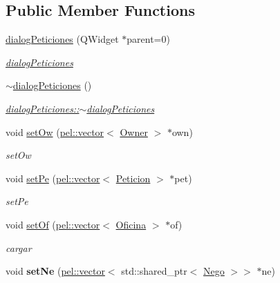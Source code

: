 \subsection*{Public Member Functions}
\begin{DoxyCompactItemize}
\item 
\hyperlink{classdialogPeticiones_a98d94817a71b0f17a67e4d50e26b0703}{dialog\+Peticiones} (Q\+Widget $\ast$parent=0)
\begin{DoxyCompactList}\small\item\em \hyperlink{classdialogPeticiones}{dialog\+Peticiones} \end{DoxyCompactList}\item 
\hypertarget{classdialogPeticiones_a7958c9d3b4c518f158b0290107b4a43f}{}\hyperlink{classdialogPeticiones_a7958c9d3b4c518f158b0290107b4a43f}{$\sim$dialog\+Peticiones} ()\label{classdialogPeticiones_a7958c9d3b4c518f158b0290107b4a43f}

\begin{DoxyCompactList}\small\item\em \hyperlink{classdialogPeticiones_a7958c9d3b4c518f158b0290107b4a43f}{dialog\+Peticiones\+::$\sim$dialog\+Peticiones} \end{DoxyCompactList}\item 
void \hyperlink{classdialogPeticiones_ac93f653300c0748b41af19e3dc47f167}{set\+Ow} (\hyperlink{classpel_1_1vector}{pel\+::vector}$<$ \hyperlink{classOwner}{Owner} $>$ $\ast$own)
\begin{DoxyCompactList}\small\item\em set\+Ow \end{DoxyCompactList}\item 
void \hyperlink{classdialogPeticiones_a6b202005bae543e302f64f0c5972714a}{set\+Pe} (\hyperlink{classpel_1_1vector}{pel\+::vector}$<$ \hyperlink{classPeticion}{Peticion} $>$ $\ast$pet)
\begin{DoxyCompactList}\small\item\em set\+Pe \end{DoxyCompactList}\item 
\hypertarget{classdialogPeticiones_a34b121f7ba858929121740ec64a669c8}{}void \hyperlink{classdialogPeticiones_a34b121f7ba858929121740ec64a669c8}{set\+Of} (\hyperlink{classpel_1_1vector}{pel\+::vector}$<$ \hyperlink{classOficina}{Oficina} $>$ $\ast$of)\label{classdialogPeticiones_a34b121f7ba858929121740ec64a669c8}

\begin{DoxyCompactList}\small\item\em cargar \end{DoxyCompactList}\item 
\hypertarget{classdialogPeticiones_ae34ff6b182c2c201c21a0448469d3429}{}void {\bfseries set\+Ne} (\hyperlink{classpel_1_1vector}{pel\+::vector}$<$ std\+::shared\+\_\+ptr$<$ \hyperlink{classNego}{Nego} $>$$>$ $\ast$ne)\label{classdialogPeticiones_ae34ff6b182c2c201c21a0448469d3429}


\end{DoxyCompactItemize}
